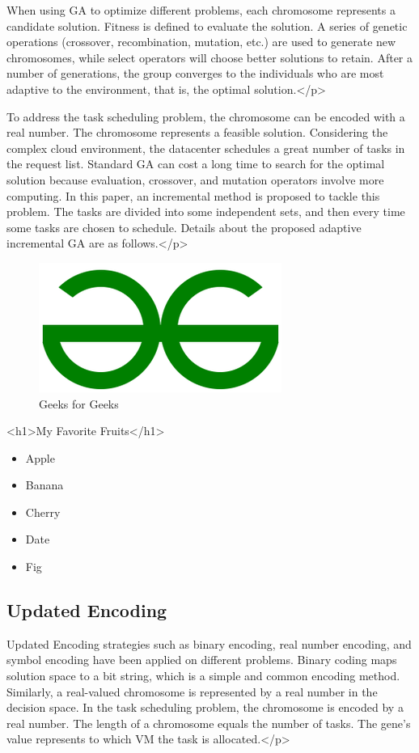 \documentclass[conference]{IEEEtran}%
\begin{document}
 When using GA to optimize different problems, each chromosome represents a candidate solution. Fitness is defined to evaluate the solution. A series of genetic operations (crossover, recombination, mutation, etc.) are used to generate new chromosomes, while select operators will choose better solutions to retain. After a number of generations, the group converges to the individuals who are most adaptive to the environment, that is, the optimal solution.</p>

 To address the task scheduling problem, the chromosome can be encoded with a real number. The chromosome represents a feasible solution. Considering the complex cloud environment, the datacenter schedules a great number of tasks in the request list. Standard GA can cost a long time to search for the optimal solution because evaluation, crossover, and mutation operators involve more computing. In this paper, an incremental method is proposed to tackle this problem. The tasks are divided into some independent sets, and then every time some tasks are chosen to schedule. Details about the proposed adaptive incremental GA are as follows.</p>


    \begin{figure}[htbp] 
    \centerline{\includegraphics[width=\linewidth]{image_1}}
    \caption{Geeks for Geeks}
    \label{fig:image_1}
    \end{figure} <h1>My Favorite Fruits</h1>
    \begin{itemize}
        \item Apple
        \item Banana
        \item Cherry
        \item Date
        \item Fig
    \end{itemize}%
\subsection{Updated Encoding}%
\label{subsec:UpdatedEncoding}%
Updated Encoding strategies such as binary encoding, real number encoding, and symbol encoding have been applied on different problems. Binary coding maps solution space to a bit string, which is a simple and common encoding method. Similarly, a real-valued chromosome is represented by a real number in the decision space. In the task scheduling problem, the chromosome is encoded by a real number. The length of a chromosome equals the number of tasks. The gene’s value represents to which VM the task is allocated.</p>
\end{document}
